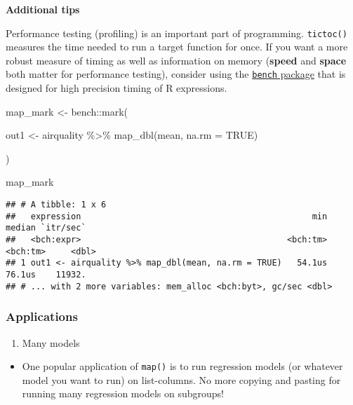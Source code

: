 \documentclass[
]{book}
\newenvironment{Shaded}{\begin{snugshade}}{\end{snugshade}}
\newcommand{\AttributeTok}[1]{\textcolor[rgb]{0.77,0.63,0.00}{#1}}
\newcommand{\ConstantTok}[1]{\textcolor[rgb]{0.00,0.00,0.00}{#1}}
\newcommand{\FunctionTok}[1]{\textcolor[rgb]{0.00,0.00,0.00}{#1}}
\newcommand{\NormalTok}[1]{#1}
\newcommand{\OtherTok}[1]{\textcolor[rgb]{0.56,0.35,0.01}{#1}}
\newcommand{\SpecialCharTok}[1]{\textcolor[rgb]{0.00,0.00,0.00}{#1}}
\providecommand{\tightlist}{%
  \setlength{\itemsep}{0pt}\setlength{\parskip}{0pt}}
\begin{document}
\textbf{Additional tips}

Performance testing (profiling) is an important part of programming. \texttt{tictoc()} measures the time needed to run a target function for once. If you want a more robust measure of timing as well as information on memory (\textbf{speed} and \textbf{space} both matter for performance testing), consider using the \href{https://github.com/r-lib/bench}{\texttt{bench} package} that is designed for high precision timing of R expressions.

\begin{Shaded}
\begin{Highlighting}[]
\NormalTok{map\_mark }\OtherTok{\textless{}{-}}\NormalTok{ bench}\SpecialCharTok{::}\FunctionTok{mark}\NormalTok{(}

\NormalTok{  out1 }\OtherTok{\textless{}{-}}\NormalTok{ airquality }\SpecialCharTok{\%\textgreater{}\%} \FunctionTok{map\_dbl}\NormalTok{(mean, }\AttributeTok{na.rm =} \ConstantTok{TRUE}\NormalTok{)}

\NormalTok{  )}

\NormalTok{map\_mark}
\end{Highlighting}
\end{Shaded}

\begin{verbatim}
## # A tibble: 1 x 6
##   expression                                              min   median `itr/sec`
##   <bch:expr>                                         <bch:tm> <bch:tm>     <dbl>
## 1 out1 <- airquality %>% map_dbl(mean, na.rm = TRUE)   54.1us   76.1us    11932.
## # ... with 2 more variables: mem_alloc <bch:byt>, gc/sec <dbl>
\end{verbatim}

\hypertarget{applications}{%
\subsubsection{Applications}\label{applications}}

\begin{enumerate}
\def\labelenumi{\arabic{enumi}.}
\tightlist
\item
  Many models
\end{enumerate}

\begin{itemize}
\tightlist
\item
  One popular application of \texttt{map()} is to run regression models (or whatever model you want to run) on list-columns. No more copying and pasting for running many regression models on subgroups!
\end{itemize}
\end{document}
